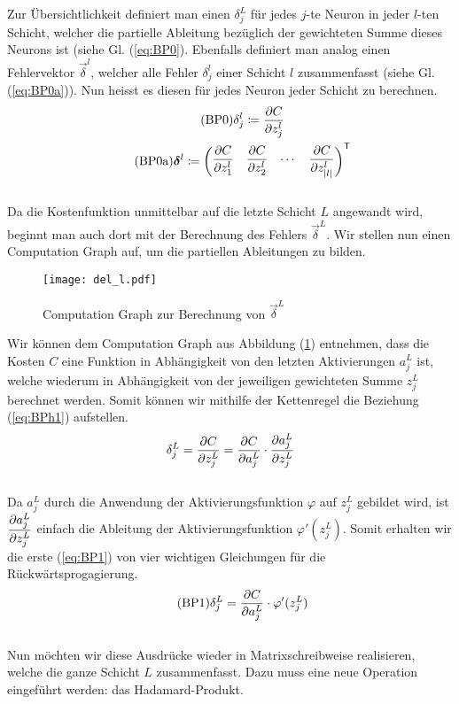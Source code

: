 \begin{appendices}
\para{}
Zur Übersichtlichkeit definiert man einen  $\delta_j^L$ für
jedes $j$-te Neuron in jeder $l$-ten Schicht, welcher die partielle Ableitung bezüglich der
gewichteten Summe dieses Neurons ist (siehe Gl. (\ref{eq:BP0}). Ebenfalls definiert man analog einen Fehlervektor
$\vec{\delta}^l$, welcher alle Fehler $\delta_j^l$ einer Schicht $l$
zusammenfasst (siehe Gl. (\ref{eq:BP0a})). Nun heisst es diesen für jedes Neuron jeder Schicht zu
berechnen.
\\
\begin{gather}
  \tag{BP0}\label{eq:BP0} \delta_j^l \coloneqq \frac{\partial C}{\partial z_j^l} \\
  \tag{BP0a}\label{eq:BP0a} \bm{\delta}^l \coloneqq \begin{pmatrix} \displaystyle\frac{\partial C}{\partial z_1^l} & \displaystyle\frac{\partial C}{\partial z_2^l} & \cdots & \displaystyle\frac{\partial C}{\partial z_{|l|}^l} \end{pmatrix}^{\mathsf{T}}
\end{gather}
\\
Da die Kostenfunktion unmittelbar auf die letzte Schicht $L$ angewandt wird, beginnt
man auch dort mit der Berechnung des Fehlers $\vec{\delta}^L$.
Wir stellen nun einen Computation Graph auf, um die partiellen Ableitungen zu bilden.
\para{}
\begin{figure}[h!]
  \centering
  \texttt{[image: del\_l.pdf]}
  \caption{Computation Graph zur Berechnung von $\vec{\delta}^L$}
  \label{fig:cg_L}
\end{figure}
\para{}
Wir können dem Computation Graph aus Abbildung (\ref{fig:cg_L}) entnehmen, dass die Kosten $C$ eine Funktion
in Abhängigkeit von den letzten Aktivierungen $a_j^L$ ist, welche wiederum in
Abhängigkeit von der jeweiligen gewichteten Summe $z_j^L$ berechnet werden.
Somit können wir mithilfe der Kettenregel die Beziehung (\ref{eq:BPh1}) aufstellen.
\\
\begin{equation}\label{eq:BPh1}
  \delta_j^L = \frac{\partial C}{\partial z_j^L} = \frac{\partial C}{\partial a_j^L} \cdot \frac{\partial a_j^L}{\partial z_j^L}
\end{equation}
\\
Da $a_j^L$ durch die Anwendung der Aktivierungsfunktion $\varphi$ auf $z_j^L$
gebildet wird, ist $\displaystyle\frac{\partial a_j^L}{\partial z_j^L}$ einfach die Ableitung der Aktivierungsfunktion
$\varphi'(z_j^L)$. Somit erhalten wir die erste (\ref{eq:BP1}) von vier
wichtigen Gleichungen für die Rückwärtsprogagierung.
\\
\begin{equation}\tag{BP1}\label{eq:BP1}
  \delta_j^L = \frac{\partial C}{\partial a_j^L} \cdot \varphi'(z_j^L)
\end{equation}
\\
Nun möchten wir diese Ausdrücke wieder in Matrixschreibweise realisieren,
welche die ganze Schicht $L$ zusammenfasst. Dazu
muss eine neue Operation eingeführt werden: das Hadamard-Produkt.


\end{appendices}
